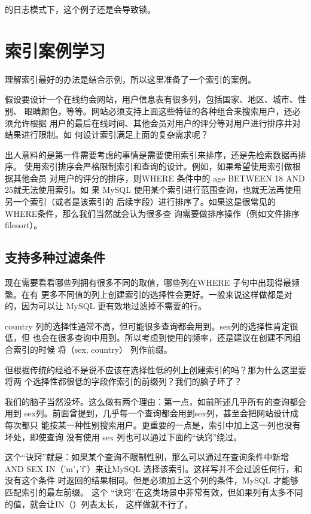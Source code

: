 的日志模式下，这个例子还是会导致锁。

\section{索引案例学习}
理解索引最好的办法是结合示例，所以这里准备了一个索引的案例。

假设要设计一个在线约会网站，用户信息表有很多列，包括国家、地区、城市、性别、
眼睛颜色，等等。网站必须支持上面这些特征的各种组合来搜索用户，还必须允许根据
用户的最后在线时间、其他会员对用户的评分等对用户进行排序井对结果进行限制。如
何设计索引满足上面的复杂需求呢？

出人意料的是第一件需要考虑的事情是需要使用索引来排序，还是先检索数据再排序。
使用索引排序会严格限制索引和查询的设计。例如，如果希望使用索引做根据其他会员
对用户的评分的排序，则WHERE 条件中的 age BETWEEN 18 AND 25就无法使用索引。如
果 MySQL 使用某个索引进行范围查询，也就无法再使用另一个索引（或者是该索引的
后续字段）进行排序了。如果这是很常见的WHERE条件，那么我们当然就会认为很多查
询需要做排序操作（例如文件排序 filesort）。

\subsection{支持多种过滤条件}
现在需要看看哪些列拥有很多不同的取值，哪些列在WHERE 子句中出现得最频繁。在有
更多不同值的列上创建索引的选择性会更好。一般来说这样做都是对的，因为可以让
MySQL 更有效地过滤掉不需要的行。

country 列的选择性通常不高，但可能很多查询都会用到。sex列的选择性肯定很低，但
也会在很多查询中用到。所以考虑到使用的频率，还是建议在创建不同组合索引的时候
将（sex, country） 列作前缀。

但根据传统的经验不是说不应该在选择性低的列上创建索引的吗？那为什么这里要将两
个选择性都很低的字段作索引的前缀列？我们的脑子坏了？

我们的脑子当然没坏。这么做有两个理由：第一点，如前所述几乎所有的查询都会用到
sex列。前面曾提到，几乎每一个查询都会用到sex列，甚至会把网站设计成每次都只
能按某一种性别搜索用户。更重要的一点是，索引中加上这一列也没有坏处，即使查询
没有使用 sex 列也可以通过下面的“诀窍”绕过。

这个“诀窍”就是：如果某个查询不限制性别，那么可以通过在查询条件中新增AND
SEX IN（'m'，'f'）来让MySQL 选择该索引。这样写并不会过滤任何行，和没有这个条件
时返回的结果相同。但是必须加上这个列的条件，MySQL 才能够匹配索引的最左前缀。
这个 “诀窍”在这类场景中非常有效，但如果列有太多不同的值，就会让IN（）列表太长，
这样做就不行了。

